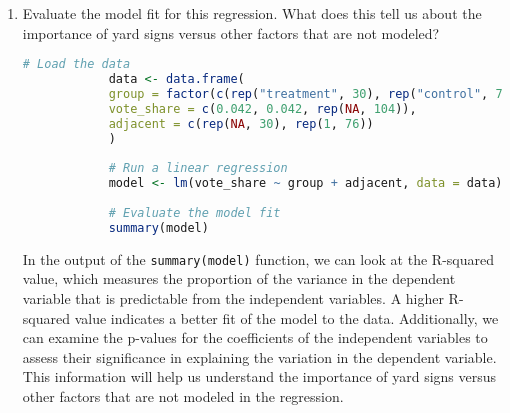\documentclass[12pt,letterpaper]{article}
\begin{document}
\begin{enumerate}
				\begin{lstlisting}[language=R]
	data <- data.frame(  group = factor(c(rep("treatment", 30), rep("control", 76))),  vote_share = c(0.042, 0.042, rep(NA, 104)),  adjacent = c(rep(NA, 30), rep(1, 76)))
	# Run a linear regression
	model <- lm(vote_share ~ group + adjacent, data = data)
	# Summary of the regression
	summary(model)
	\end{lstlisting}
	
	\item [(d)] Evaluate the model fit for this regression.  What does this	tell us about the importance of yard signs versus other factors that are not modeled?
	
		\begin{lstlisting}[language=R]
			# Load the data
			data <- data.frame(
			group = factor(c(rep("treatment", 30), rep("control", 76))),
			vote_share = c(0.042, 0.042, rep(NA, 104)),
			adjacent = c(rep(NA, 30), rep(1, 76))
			)
			
			# Run a linear regression
			model <- lm(vote_share ~ group + adjacent, data = data)
			
			# Evaluate the model fit
			summary(model)
		\end{lstlisting}
		
		In the output of the \texttt{summary(model)} function, we can look at the R-squared value, which measures the proportion of the variance in the dependent variable that is predictable from the independent variables. A higher R-squared value indicates a better fit of the model to the data. Additionally, we can examine the p-values for the coefficients of the independent variables to assess their significance in explaining the variation in the dependent variable. This information will help us understand the importance of yard signs versus other factors that are not modeled in the regression.
	
\end{enumerate}  
\end{document}
